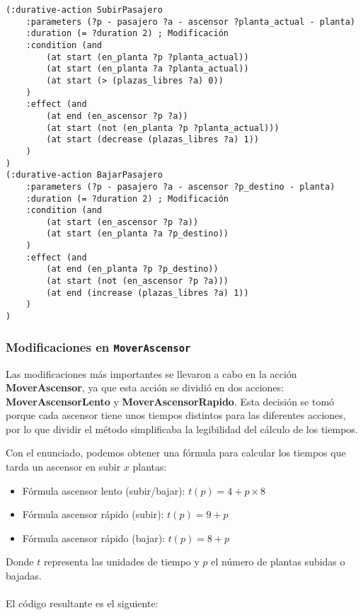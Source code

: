\documentclass{article}
\begin{document}
\begin{verbatim}
(:durative-action SubirPasajero
    :parameters (?p - pasajero ?a - ascensor ?planta_actual - planta)
    :duration (= ?duration 2) ; Modificación
    :condition (and
        (at start (en_planta ?p ?planta_actual))
        (at start (en_planta ?a ?planta_actual))
        (at start (> (plazas_libres ?a) 0))
    )
    :effect (and
        (at end (en_ascensor ?p ?a))
        (at start (not (en_planta ?p ?planta_actual)))
        (at start (decrease (plazas_libres ?a) 1))
    )
)
(:durative-action BajarPasajero
    :parameters (?p - pasajero ?a - ascensor ?p_destino - planta)
    :duration (= ?duration 2) ; Modificación
    :condition (and
        (at start (en_ascensor ?p ?a))
        (at start (en_planta ?a ?p_destino))
    )
    :effect (and
        (at end (en_planta ?p ?p_destino))
        (at start (not (en_ascensor ?p ?a)))
        (at end (increase (plazas_libres ?a) 1))
    )
)
\end{verbatim}

\subsubsection{Modificaciones en \texttt{MoverAscensor}}

Las modificaciones más importantes se llevaron a cabo en la acción \textbf{MoverAscensor}, ya que esta acción se dividió en dos acciones: \textbf{MoverAscensorLento} y \textbf{MoverAscensorRapido}. Esta decisión se tomó porque cada ascensor tiene unos tiempos distintos para las diferentes acciones, por lo que dividir el método simplificaba la legibilidad del cálculo de los tiempos.

Con el enunciado, podemos obtener una fórmula para calcular los tiempos que tarda un ascensor en subir \(x\) plantas:

\begin{itemize}
    \item Fórmula ascensor lento (subir/bajar): \(t(p) = 4 + p \times 8\)
    \item Fórmula ascensor rápido (subir): \(t(p) = 9 + p\)
    \item Fórmula ascensor rápido (bajar): \(t(p) = 8 + p\)
\end{itemize}

Donde \(t\) representa las unidades de tiempo y \(p\) el número de plantas subidas o bajadas.
\\\\
El código resultante es el siguiente:
\end{document}
